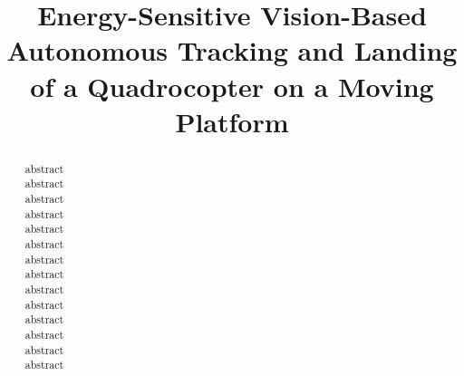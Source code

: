 \documentclass[conference]{IEEEtran}
\begin{document}
\title{Energy-Sensitive Vision-Based Autonomous Tracking and Landing of a Quadrocopter on a Moving Platform} %

\author{
}

\maketitle


\begin{abstract}

abstract\\
abstract\\
abstract\\
abstract\\
abstract\\
abstract\\
abstract\\
abstract\\
abstract\\
abstract\\
abstract\\
abstract\\
abstract\\
abstract

\end{abstract}

%
\IEEEpeerreviewmaketitle
\end{document}
